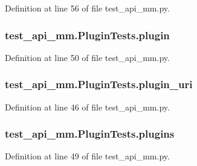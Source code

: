 Definition at line 56 of file test\+\_\+api\+\_\+mm.\+py.

\subsubsection[{\texorpdfstring{plugin}{plugin}}]{\setlength{\rightskip}{0pt plus 5cm}test\+\_\+api\+\_\+mm.\+Plugin\+Tests.\+plugin}\hypertarget{classtest__api__mm_1_1_plugin_tests_adc0ac8ea35dc2eb0ffa8f04ed174c237}{}\label{classtest__api__mm_1_1_plugin_tests_adc0ac8ea35dc2eb0ffa8f04ed174c237}


Definition at line 50 of file test\+\_\+api\+\_\+mm.\+py.

\subsubsection[{\texorpdfstring{plugin\+\_\+uri}{plugin_uri}}]{\setlength{\rightskip}{0pt plus 5cm}test\+\_\+api\+\_\+mm.\+Plugin\+Tests.\+plugin\+\_\+uri}\hypertarget{classtest__api__mm_1_1_plugin_tests_a8b5044f56f9f04bb404a0956532f738c}{}\label{classtest__api__mm_1_1_plugin_tests_a8b5044f56f9f04bb404a0956532f738c}


Definition at line 46 of file test\+\_\+api\+\_\+mm.\+py.

\subsubsection[{\texorpdfstring{plugins}{plugins}}]{\setlength{\rightskip}{0pt plus 5cm}test\+\_\+api\+\_\+mm.\+Plugin\+Tests.\+plugins}\hypertarget{classtest__api__mm_1_1_plugin_tests_a9eeb2612e7ca0f04a7ad3dece3467a68}{}\label{classtest__api__mm_1_1_plugin_tests_a9eeb2612e7ca0f04a7ad3dece3467a68}


Definition at line 49 of file test\+\_\+api\+\_\+mm.\+py.

